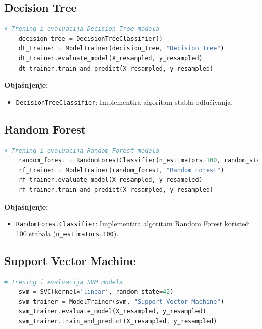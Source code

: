 \documentclass[zavrsnirad]{fer}
\begin{document}
\subsection{Decision Tree}

\begin{lstlisting}[language=Python, caption={Trening i evaluacija Decision Tree modela}]
	# Trening i evaluacija Decision Tree modela
	decision_tree = DecisionTreeClassifier()
	dt_trainer = ModelTrainer(decision_tree, "Decision Tree")
	dt_trainer.evaluate_model(X_resampled, y_resampled)
	dt_trainer.train_and_predict(X_resampled, y_resampled)
\end{lstlisting}

\noindent \textbf{Objašnjenje:}
\begin{itemize}
	\item \texttt{DecisionTreeClassifier}: Implementira algoritam stabla odlučivanja.
\end{itemize}

\subsection{Random Forest}

\begin{lstlisting}[language=Python, caption={Trening i evaluacija Random Forest modela}]
	# Trening i evaluacija Random Forest modela
	random_forest = RandomForestClassifier(n_estimators=100, random_state=42)
	rf_trainer = ModelTrainer(random_forest, "Random Forest")
	rf_trainer.evaluate_model(X_resampled, y_resampled)
	rf_trainer.train_and_predict(X_resampled, y_resampled)
\end{lstlisting}

\noindent \textbf{Objašnjenje:}
\begin{itemize}
	\item \texttt{RandomForestClassifier}: Implementira algoritam Random Forest koristeći 100 stabala (\texttt{n\_estimators=100}).
\end{itemize}

\subsection{Support Vector Machine}

\begin{lstlisting}[language=Python, caption={Trening i evaluacija SVM modela}]
	# Trening i evaluacija SVM modela
	svm = SVC(kernel='linear', random_state=42)
	svm_trainer = ModelTrainer(svm, "Support Vector Machine")
	svm_trainer.evaluate_model(X_resampled, y_resampled)
	svm_trainer.train_and_predict(X_resampled, y_resampled)
\end{lstlisting}
\end{document}
